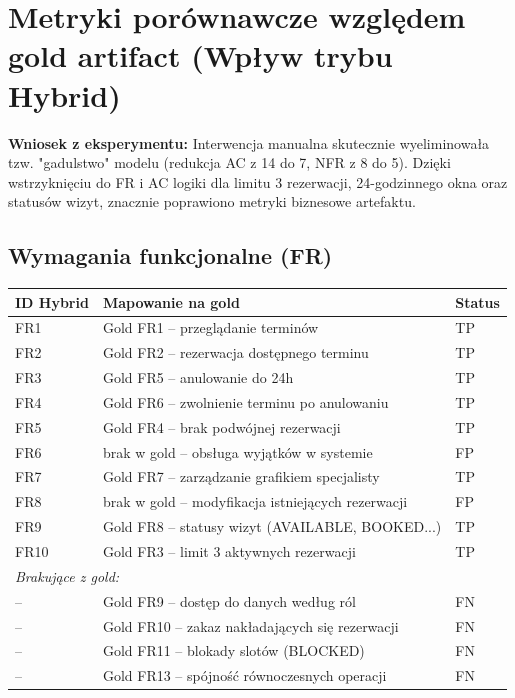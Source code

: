 \documentclass[12pt,a4paper]{article}
\newcommand{\tp}[1]{\colorbox{tpcolor}{\small #1}}
\newcommand{\fp}[1]{\colorbox{fpcolor}{\small #1}}
\newcommand{\fn}[1]{\colorbox{fncolor}{\small #1}}
\begin{document}
\newpage

\section{Metryki porównawcze względem gold artifact (Wpływ trybu Hybrid)}

\begin{mdframed}[backgroundcolor=metabg, linewidth=0pt, innerleftmargin=10pt, innerrightmargin=10pt, innertopmargin=8pt, innerbottommargin=8pt]
\small
\textbf{Wniosek z eksperymentu:} Interwencja manualna skutecznie wyeliminowała tzw. "gadulstwo" modelu (redukcja AC z 14 do 7, NFR z 8 do 5). Dzięki wstrzyknięciu do FR i AC logiki dla limitu 3 rezerwacji, 24-godzinnego okna oraz statusów wizyt, znacznie poprawiono metryki biznesowe artefaktu.
\end{mdframed}

\vspace{0.8em}

\subsection{Wymagania funkcjonalne (FR)}

\begin{tabular}{p{2.5cm} p{7cm} l}
\toprule
\textbf{ID Hybrid} & \textbf{Mapowanie na gold} & \textbf{Status} \\
\midrule
FR1 & Gold FR1 -- przeglądanie terminów & \tp{TP} \\
FR2 & Gold FR2 -- rezerwacja dostępnego terminu & \tp{TP} \\
FR3 & Gold FR5 -- anulowanie do 24h & \tp{TP} \\
FR4 & Gold FR6 -- zwolnienie terminu po anulowaniu & \tp{TP} \\
FR5 & Gold FR4 -- brak podwójnej rezerwacji & \tp{TP} \\
FR6 & brak w gold -- obsługa wyjątków w systemie & \fp{FP} \\
FR7 & Gold FR7 -- zarządzanie grafikiem specjalisty & \tp{TP} \\
FR8 & brak w gold -- modyfikacja istniejących rezerwacji & \fp{FP} \\
FR9 & Gold FR8 -- statusy wizyt (AVAILABLE, BOOKED...) & \tp{TP} \\
FR10 & Gold FR3 -- limit 3 aktywnych rezerwacji & \tp{TP} \\
\midrule
\multicolumn{3}{l}{\textit{Brakujące z gold:}} \\
-- & Gold FR9 -- dostęp do danych według ról & \fn{FN} \\
-- & Gold FR10 -- zakaz nakładających się rezerwacji & \fn{FN} \\
-- & Gold FR11 -- blokady slotów (BLOCKED) & \fn{FN} \\
-- & Gold FR13 -- spójność równoczesnych operacji & \fn{FN} \\
\bottomrule
\end{tabular}
\end{document}
